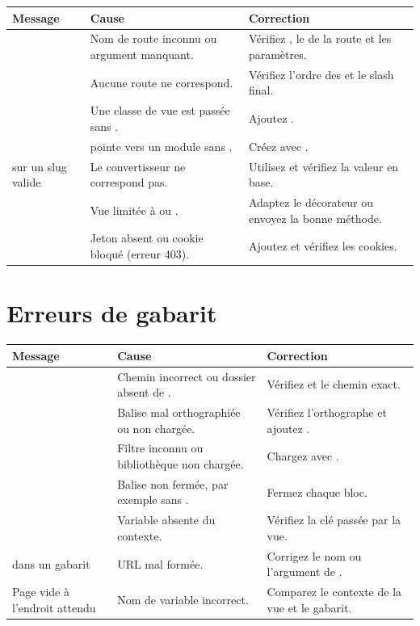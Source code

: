 \begin{longtable}{L{5.2cm} L{4.5cm} L{4.7cm}}
\toprule
\textbf{Message} & \textbf{Cause} & \textbf{Correction} \\
\midrule
\endhead
\footnotesize
{} & Nom de route inconnu ou argument manquant. & Vérifiez
, le  de la route et les paramètres. \\
 & Aucune route ne correspond. & Vérifiez l'ordre des
 et le slash final. \\
 & Une classe de vue est passée sans
. & Ajoutez . \\
 &  pointe vers un module sans
. & Créez  avec
. \\
 sur un slug valide & Le convertisseur ne correspond pas. & Utilisez
 et vérifiez la valeur en base. \\
 & Vue limitée à  ou . &
Adaptez le décorateur ou envoyez la bonne méthode. \\
 & Jeton absent ou cookie bloqué
(erreur 403). & Ajoutez
 et vérifiez les cookies. \\
\bottomrule
\end{longtable}

\section{Erreurs de gabarit}

\begin{longtable}{L{5.2cm} L{4.5cm} L{4.7cm}}
\toprule
\textbf{Message} & \textbf{Cause} & \textbf{Correction} \\
\midrule
\endhead
\footnotesize
{} & Chemin incorrect ou dossier absent de
. & Vérifiez  et le chemin exact. \\
 & Balise mal orthographiée ou non chargée. & Vérifiez
l'orthographe et ajoutez . \\
 & Filtre inconnu ou bibliothèque non chargée. & Chargez
 avec . \\
 & Balise non fermée, par exemple
 sans . & Fermez chaque bloc. \\
 & Variable absente du contexte. & Vérifiez la clé
passée par la vue. \\
 dans un gabarit & URL mal formée. & Corrigez le nom ou
l'argument de . \\
Page vide à l'endroit attendu & Nom de variable incorrect. & Comparez le contexte
de la vue et le gabarit. \\
\bottomrule
\end{longtable}

